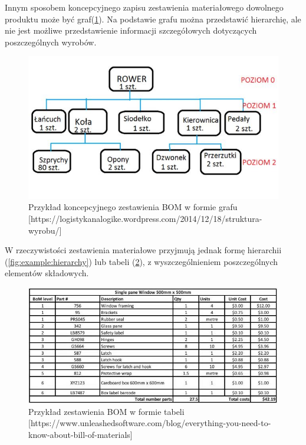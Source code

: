 \documentclass[12pt,twoside]{article}
\begin{document}
Innym sposobem koncepcyjnego zapisu zestawienia materiałowego dowolnego produktu może być graf(\ref{fig:example:graph}). Na podstawie grafu można przedstawić hierarchię, ale nie jest możliwe przedstawienie informacji szczegółowych dotyczących poszczególnych wyrobów.

\begin{figure}
	\centering
	\includegraphics[width=\textwidth]{figures/examples/graph.jpg}
	\caption{Przykład koncepcyjnego zestawienia BOM w formie grafu [https://logistykanalogike.wordpress.com/2014/12/18/struktura-wyrobu/]}
\label{fig:example:graph}
\end{figure}

W rzeczywistości zestawienia materiałowe przyjmują jednak formę hierarchii (\ref{fig:example:hierarchy}) lub tabeli (\ref{fig:example:table}), z wyszczególnieniem poszczególnych elementów składowych.

\begin{figure}
	\centering
	\includegraphics[width=\textwidth]{figures/examples/table.jpg}
	\caption{Przykład zestawienia BOM w formie tabeli [https://www.unleashedsoftware.com/blog/everything-you-need-to-know-about-bill-of-materials]}
\label{fig:example:table}
\end{figure}
\end{document}
